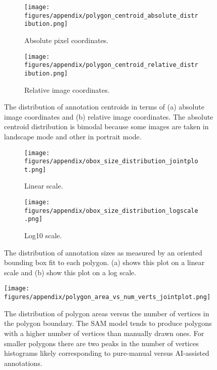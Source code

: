 \begin{figure*}[ht]
\centering
\begin{subfigure}[b]{0.4\textwidth}
 \texttt{[image: figures/appendix/polygon\_centroid\_absolute\_distribution.png]}
 \caption{Absolute pixel coordinates.}
 \label{fig:centroid_abs}
\end{subfigure}
\hfill
\begin{subfigure}[b]{0.4\textwidth}
 \texttt{[image: figures/appendix/polygon\_centroid\_relative\_distribution.png]}
 \caption{Relative image coordinates.}
 \label{fig:centroid_rel}
\end{subfigure}
\caption{The distribution of annotation centroids in terms of (a) absolute image coordinates and (b) relative image coordinates. The absolute centroid distribution is bimodal because some images are taken in landscape mode and other in portrait mode.}
\label{fig:centroid_location_distri}
\end{figure*}


\begin{figure*}[ht]
\centering
\begin{subfigure}[b]{0.4\textwidth}
  \texttt{[image: figures/appendix/obox\_size\_distribution\_jointplot.png]}
  \caption{Linear scale.}
  \label{fig:annot_obox_size_dist_linear}
\end{subfigure}
\hfill
\begin{subfigure}[b]{0.4\textwidth}
  \texttt{[image: figures/appendix/obox\_size\_distribution\_logscale.png]}
  \caption{Log10 scale.}
  \label{fig:annot_obox_size_dist_log}
\end{subfigure}
\caption{The distribution of annotation sizes as measured by an oriented bounding box fit to each polygon. (a) shows this plot on a linear scale and (b) show this plot on a log scale.}
\label{fig:annot_obox_size_dist}
\end{figure*}


\begin{figure*}[ht]
\centering
\texttt{[image: figures/appendix/polygon\_area\_vs\_num\_verts\_jointplot.png]}
\caption[]{
    The distribution of polygon areas versus the number of vertices in the polygon boundary.
    The SAM model tends to produce polygons with a higher number of vertices
    than manually drawn ones.  For smaller polygons there are two peaks in the
    number of vertices histograms likely corresponding to pure-manual versus
    AI-assisted annotations.
}
\label{fig:annot_area_verts_distri}
\end{figure*}

